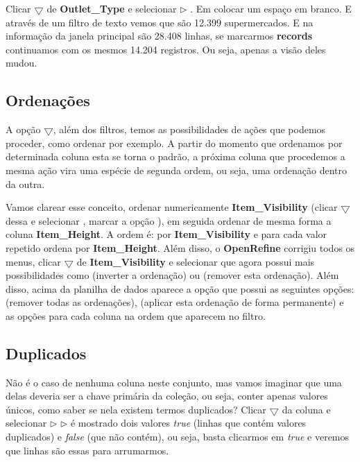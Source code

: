 \documentclass[a4paper,11pt]{article}
\begin{document}
Clicar $\bigtriangledown$ de \textbf{Outlet\_Type} e selecionar  $\triangleright$ . Em  colocar um espaço em branco. E através de um filtro de texto vemos que são 12.399 supermercados. E na informação da janela principal são 28.408 linhas, se marcarmos \textbf{records} continuamos com os mesmos 14.204 registros. Ou seja, apenas a visão deles mudou.

\subsection{Ordenações}
A opção $\bigtriangledown$, além dos filtros, temos as possibilidades de ações que podemos proceder, como ordenar por exemplo. A partir do momento que ordenamos por determinada coluna esta se torna o padrão, a próxima coluna que procedemos a mesma ação vira uma espécie de segunda ordem, ou seja, uma ordenação dentro da outra. 

Vamos clarear esse conceito, ordenar numericamente \textbf{Item\_Visibility} (clicar $\bigtriangledown$ dessa e selecionar , marcar a opção ), em seguida ordenar de mesma forma a coluna \textbf{Item\_Height}. A ordem é: por \textbf{Item\_Visibility} e para cada valor repetido ordena por \textbf{Item\_Height}. Além disso, o \textbf{OpenRefine} corrigiu todos os menus, clicar $\bigtriangledown$ de \textbf{Item\_Visibility} e selecionar  que agora possui mais possibilidades como  (inverter a ordenação) ou  (remover esta ordenação). Além disso, acima da planilha de dados aparece a opção  que possui as seguintes opções:  (remover todas as ordenações),  (aplicar esta ordenação de forma permanente) e as opções para cada coluna na ordem que aparecem no filtro.

\subsection{Duplicados}
Não é o caso de nenhuma coluna neste conjunto, mas vamos imaginar que uma delas deveria ser a chave primária da coleção, ou seja, conter apenas valores únicos, como saber se nela existem termos duplicados? Clicar $\bigtriangledown$ da coluna e selecionar  $\triangleright$  $\triangleright$  é mostrado dois valores \textit{true} (linhas que contém valores duplicados) e \textit{false} (que não contém), ou seja, basta clicarmos em \textit{true} e veremos que linhas são essas para arrumarmos.
\end{document}
